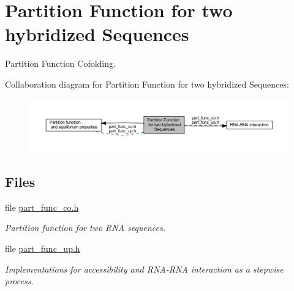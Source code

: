 \hypertarget{group__pf__cofold}{}\section{Partition Function for two hybridized Sequences}
\label{group__pf__cofold}


Partition Function Cofolding.  


Collaboration diagram for Partition Function for two hybridized Sequences\+:
\nopagebreak
\begin{figure}[H]
\begin{center}
\leavevmode
\includegraphics[width=350pt]{group__pf__cofold}
\end{center}
\end{figure}
\subsection*{Files}
\begin{DoxyCompactItemize}
\item 
file \hyperlink{part__func__co_8h}{part\+\_\+func\+\_\+co.\+h}
\begin{DoxyCompactList}\small\item\em Partition function for two R\+NA sequences. \end{DoxyCompactList}\item 
file \hyperlink{part__func__up_8h}{part\+\_\+func\+\_\+up.\+h}
\begin{DoxyCompactList}\small\item\em Implementations for accessibility and R\+N\+A-\/\+R\+NA interaction as a stepwise process. \end{DoxyCompactList}\end{DoxyCompactItemize}
